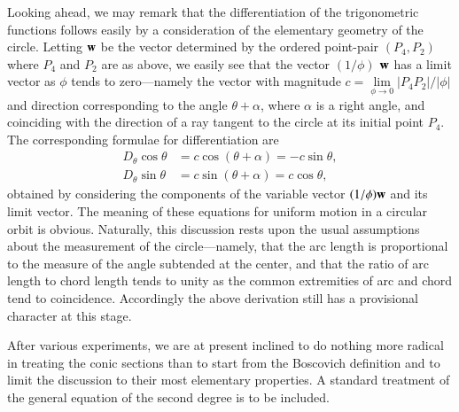 Looking ahead, we may remark that the differentiation of the
trigonometric functions follows easily by a consideration of the
elementary geometry of the circle. Letting $\mathbf{w}$ be the vector
determined by the ordered point-pair $(P_4, P_2)$ where $P_4$ and
$P_2$ are as above, we easily see that the vector $(1/\phi)$ $\mathbf{w}$ has
a limit vector as $\phi$ tends to zero---namely the vector with
magnitude $c = \lim\limits_{\phi \to 0} |P_4 P_2| / | \phi |$\pageoriginale and
direction corresponding to the angle $\theta + \alpha$, where $\alpha$
is a right angle, and coinciding with the direction of a ray tangent
to the circle at its initial point $P_4$. The corresponding formulae
for differentiation are
\begin{align*}
D_\theta \cos \theta & = c \cos (\theta + \alpha) = - c \sin \theta,\\
D_\theta \sin \theta & = c \sin (\theta + \alpha) = c \cos \theta,
\end{align*}
obtained by considering the components of the variable vector
$(1/\phi) \mathbf{w}$ and its limit vector. The meaning of these equations
for uniform motion in a circular orbit is obvious. Naturally, this
discussion rests upon the usual assumptions about the measurement of
the circle---namely, that the arc length is proportional to the
measure of the angle subtended at the center, and that the ratio of
arc length to chord length tends to unity as the common extremities of
arc and chord tend to coincidence. Accordingly the above derivation
still has a provisional character at this stage.

After various experiments, we are at present inclined to do nothing
more radical in treating the conic sections than to start from the
Boscovich definition and to limit the discussion to their most
elementary properties. A standard treatment of the general equation of
the second degree is to be included.

